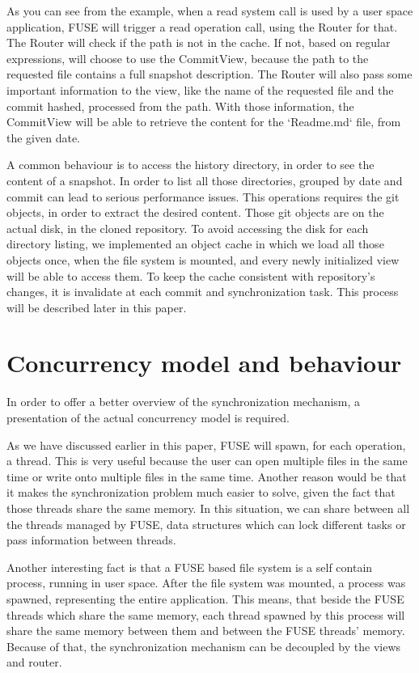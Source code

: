 As you can see from the example, when a read system call is used by a user space application, FUSE will trigger a read operation call, using the Router for that. The Router will check if the path is not in the cache. If not, based on regular expressions, will choose to use the CommitView, because the path to the requested file contains a full snapshot description. The Router will also pass some important information to the view, like the name of the requested file and the commit hashed, processed from the path. With those information, the CommitView will be able to retrieve the content for the `Readme.md` file, from the given date.

A common behaviour is to access the history directory, in order to see the content of a snapshot. In order to list all those directories, grouped by date and commit can lead to serious performance issues. This operations requires the git objects, in order to extract the desired content. Those git objects are on the actual disk, in the cloned repository. To avoid accessing the disk for each directory listing, we implemented an object cache in which we load all those objects once, when the file system is mounted, and every newly initialized view will be able to access them. To keep the cache consistent with repository's changes, it is invalidate at each commit and synchronization task. This process will be described later in this paper.

\section{Concurrency model and behaviour}
In order to offer a better overview of the synchronization mechanism, a presentation of the actual concurrency model is required.

As we have discussed earlier in this paper, FUSE will spawn, for each operation, a thread. This is very useful because the user can open multiple files in the same time or write onto multiple files in the same time. Another reason would be that it makes the synchronization problem much easier to solve, given the fact that those threads share the same memory. In this situation, we can share between all the threads managed by FUSE, data structures which can lock different tasks or pass information between threads.

Another interesting fact is that a FUSE based file system is a self contain process, running in user space. After the file system was mounted, a process was spawned, representing the entire application. This means, that beside the FUSE threads which share the same memory, each thread spawned by this process will share the same memory between them and between the FUSE threads' memory. Because of that, the synchronization mechanism can be decoupled by the views and router.

